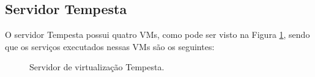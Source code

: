 \subsection{Servidor Tempesta}
\label{section:serv_tempesta}

O servidor Tempesta possui quatro \ac{VM}s, como pode ser visto na Figura \ref{fig:servidor_tempesta}, sendo que os serviços executados nessas 
\ac{VM}s são os seguintes:

\begin{figure}[h!]
 \centering
 \caption{Servidor de virtualização Tempesta.}
 \label{fig:servidor_tempesta}
\end{figure}

